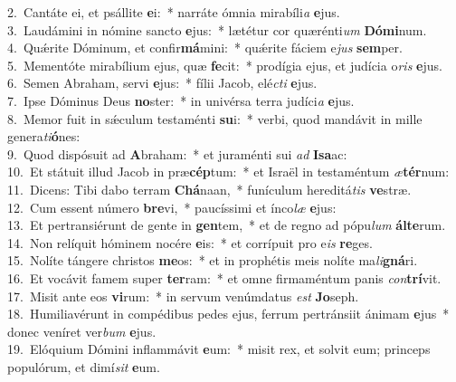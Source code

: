 {2.~}Cantáte ei, et psállite \textbf{e}i:~* narráte ómnia mirabíli\textit{a} \textbf{e}jus.\\
{3.~}Laudámini in nómine sancto \textbf{e}jus:~* lætétur cor quærénti\textit{um} \textbf{Dó}\textbf{mi}num.\\
{4.~}Quǽrite Dóminum, et confir\textbf{má}mini:~* quǽrite fáciem e\textit{jus} \textbf{sem}per.\\
{5.~}Mementóte mirabílium ejus, quæ \textbf{fe}cit:~* prodígia ejus, et judícia o\textit{ris} \textbf{e}jus.\\
{6.~}Semen Abraham, servi \textbf{e}jus:~* fílii Jacob, elé\textit{cti} \textbf{e}jus.\\
{7.~}Ipse Dóminus Deus \textbf{no}ster:~* in univérsa terra judíci\textit{a} \textbf{e}jus.\\
{8.~}Memor fuit in sǽculum testaménti \textbf{su}i:~* verbi, quod mandávit in mille genera\textit{ti}\textbf{ó}nes:\\
{9.~}Quod dispósuit ad \textbf{A}braham:~* et juraménti sui \textit{ad} \textbf{I}\textbf{sa}ac:\\
{10.~}Et státuit illud Jacob in præ\textbf{cép}tum:~* et Israël in testaméntum \textit{æ}\textbf{tér}num:\\
{11.~}Dicens: Tibi dabo terram \textbf{Chá}naan,~* funículum hereditá\textit{tis} \textbf{ve}stræ.\\
{12.~}Cum essent número \textbf{bre}vi,~* paucíssimi et ínco\textit{læ} \textbf{e}jus:\\
{13.~}Et pertransiérunt de gente in \textbf{gen}tem,~* et de regno ad pópu\textit{lum} \textbf{ál}\textbf{te}rum.\\
{14.~}Non relíquit hóminem nocére \textbf{e}is:~* et corrípuit pro e\textit{is} \textbf{re}ges.\\
{15.~}Nolíte tángere christos \textbf{me}os:~* et in prophétis meis nolíte ma\textit{li}\textbf{gná}ri.\\
{16.~}Et vocávit famem super \textbf{ter}ram:~* et omne firmaméntum panis \textit{con}\textbf{trí}vit.\\
{17.~}Misit ante eos \textbf{vi}rum:~* in servum venúmdatus \textit{est} \textbf{Jo}seph.\\
{18.~}Humiliavérunt in compédibus pedes ejus, ferrum pertránsiit ánimam \textbf{e}jus~* donec veníret ver\textit{bum} \textbf{e}jus.\\
{19.~}Elóquium Dómini inflammávit \textbf{e}um:~* misit rex, et solvit eum; princeps populórum, et dimí\textit{sit} \textbf{e}um.\\
